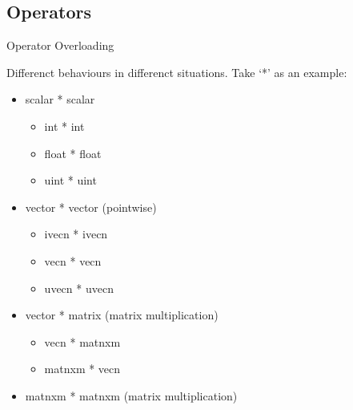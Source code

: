 \subsection{Operators}

\begin{frame}{Operator Overloading}

    Differenct behaviours in differenct situations. Take `*' as an example:
    \begin{itemize}
        \item scalar * scalar
        \begin{itemize}
            \item int * int
            \item float * float
            \item uint * uint
        \end{itemize}
        \item vector * vector (pointwise)
        \begin{itemize}
            \item ivecn * ivecn
            \item vecn * vecn
            \item uvecn * uvecn
        \end{itemize}
        \item vector * matrix (matrix multiplication)
        \begin{itemize}
            \item vecn * matnxm
            \item matnxm * vecn
        \end{itemize}
        \item matnxm * matnxm (matrix multiplication)
    \end{itemize}

\end{frame}